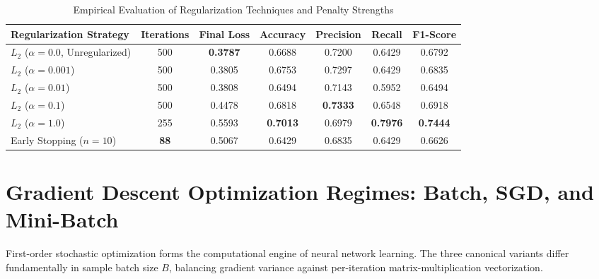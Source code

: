 \documentclass[12pt]{article}
\begin{document}
\begin{table}[H]
\centering
\caption{Empirical Evaluation of Regularization Techniques and Penalty Strengths}
\vspace{0.2cm}
\begin{tabular}{lcccccc}
\toprule
\textbf{Regularization Strategy} & \textbf{Iterations} & \textbf{Final Loss} & \textbf{Accuracy} & \textbf{Precision} & \textbf{Recall} & \textbf{F1-Score} \\
\midrule
$L_2$ ($\alpha = 0.0$, Unregularized) & 500 & \textbf{0.3787} & 0.6688 & 0.7200 & 0.6429 & 0.6792 \\
$L_2$ ($\alpha = 0.001$)             & 500 & 0.3805 & 0.6753 & 0.7297 & 0.6429 & 0.6835 \\
$L_2$ ($\alpha = 0.01$)              & 500 & 0.3808 & 0.6494 & 0.7143 & 0.5952 & 0.6494 \\
$L_2$ ($\alpha = 0.1$)               & 500 & 0.4478 & 0.6818 & \textbf{0.7333} & 0.6548 & 0.6918 \\
$L_2$ ($\alpha = 1.0$)               & 255 & 0.5593 & \textbf{0.7013} & 0.6979 & \textbf{0.7976} & \textbf{0.7444} \\
Early Stopping ($n=10$)              & \textbf{88}  & 0.5067 & 0.6429 & 0.6835 & 0.6429 & 0.6626 \\
\bottomrule
\end{tabular}
\end{table}

\section{Gradient Descent Optimization Regimes: Batch, SGD, and Mini-Batch}

First-order stochastic optimization forms the computational engine of neural network learning. The three canonical variants differ fundamentally in sample batch size $B$, balancing gradient variance against per-iteration matrix-multiplication vectorization.
\end{document}
